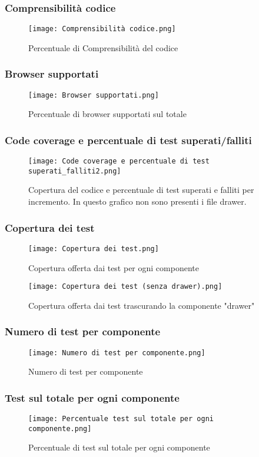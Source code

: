     \subsubsection{Comprensibilità codice}
    \begin{figure}[H]
      \centering
      \texttt{[image: Comprensibilità codice.png]}
      \caption{Percentuale di Comprensibilità del codice}
    \end{figure}

    \subsubsection{Browser supportati}
    \begin{figure}[H]
      \centering
      \texttt{[image: Browser supportati.png]}
      \caption{Percentuale di browser supportati sul totale}
    \end{figure}

    \subsubsection{Code coverage e percentuale di test superati/falliti}
    \begin{figure}[H]
      \centering
      \texttt{[image: Code coverage e percentuale di test superati\_falliti2.png]}
      \caption{Copertura del codice e percentuale di test superati e falliti per incremento. In questo grafico non sono presenti i file drawer.}
    \end{figure}

    \subsubsection{Copertura dei test}
    \begin{figure}[H]
      \centering
      \texttt{[image: Copertura dei test.png]}
      \caption{Copertura offerta dai test per ogni componente}
    \end{figure}

    \begin{figure}[H]
      \centering
      \texttt{[image: Copertura dei test (senza drawer).png]}
      \caption{Copertura offerta dai test trascurando la componente "drawer"}
    \end{figure}

    \subsubsection{Numero di test per componente}
    \begin{figure}[H]
      \centering
      \texttt{[image: Numero di test per componente.png]}
      \caption{Numero di test per componente}
    \end{figure}

    \subsubsection{Test sul totale per ogni componente}
    \begin{figure}[H]
      \centering
      \texttt{[image: Percentuale test sul totale per ogni componente.png]}
      \caption{Percentuale di test sul totale per ogni componente}
    \end{figure}
